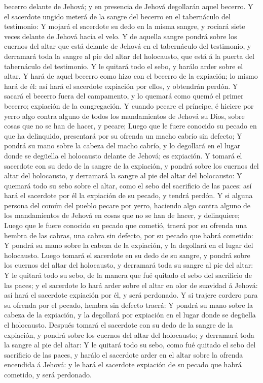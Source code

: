 becerro delante de Jehová; y en presencia de Jehová degollarán aquel
becerro.  Y el sacerdote ungido meterá de la sangre del
becerro en el tabernáculo del testimonio:  Y mojará el
sacerdote su dedo en la misma sangre, y rociará siete veces delante de
Jehová hacia el velo.  Y de aquella sangre pondrá sobre los
cuernos del altar que está delante de Jehová en el tabernáculo del
testimonio, y derramará toda la sangre al pie del altar del holocausto,
que está á la puerta del tabernáculo del testimonio.  Y le
quitará todo el sebo, y harálo arder sobre el altar.  Y
hará de aquel becerro como hizo con el becerro de la expiación; lo mismo
hará de él: así hará el sacerdote expiación por ellos, y obtendrán
perdón.  Y sacará el becerro fuera del campamento, y lo
quemará como quemó el primer becerro; expiación de la congregación.
 Y cuando pecare el príncipe, é hiciere por yerro algo
contra alguno de todos los mandamientos de Jehová su Dios, sobre cosas
que no se han de hacer, y pecare;  Luego que le fuere
conocido su pecado en que ha delinquido, presentará por su ofrenda un
macho cabrío sin defecto;  Y pondrá su mano sobre la cabeza
del macho cabrío, y lo degollará en el lugar donde se degüella el
holocausto delante de Jehová; es expiación.  Y tomará el
sacerdote con su dedo de la sangre de la expiación, y pondrá sobre los
cuernos del altar del holocausto, y derramará la sangre al pie del altar
del holocausto:  Y quemará todo su sebo sobre el altar,
como el sebo del sacrificio de las paces: así hará el sacerdote por él
la expiación de su pecado, y tendrá perdón.  Y si alguna
persona del común del pueblo pecare por yerro, haciendo algo contra
alguno de los mandamientos de Jehová en cosas que no se han de hacer, y
delinquiere;  Luego que le fuere conocido su pecado que
cometió, traerá por su ofrenda una hembra de las cabras, una cabra sin
defecto, por su pecado que habrá cometido:  Y pondrá su
mano sobre la cabeza de la expiación, y la degollará en el lugar del
holocausto.  Luego tomará el sacerdote en su dedo de su
sangre, y pondrá sobre los cuernos del altar del holocausto, y derramará
toda su sangre al pie del altar:  Y le quitará todo su
sebo, de la manera que fué quitado el sebo del sacrificio de las paces;
y el sacerdote lo hará arder sobre el altar en olor de suavidad á
Jehová: así hará el sacerdote expiación por él, y será perdonado.
 Y si trajere cordero para su ofrenda por el pecado, hembra
sin defecto traerá:  Y pondrá su mano sobre la cabeza de la
expiación, y la degollará por expiación en el lugar donde se degüella el
holocausto.  Después tomará el sacerdote con su dedo de la
sangre de la expiación, y pondrá sobre los cuernos del altar del
holocausto; y derramará toda la sangre al pie del altar:  Y
le quitará todo su sebo, como fué quitado el sebo del sacrificio de las
paces, y harálo el sacerdote arder en el altar sobre la ofrenda
encendida á Jehová: y le hará el sacerdote expiación de su pecado que
habrá cometido, y será perdonado.

